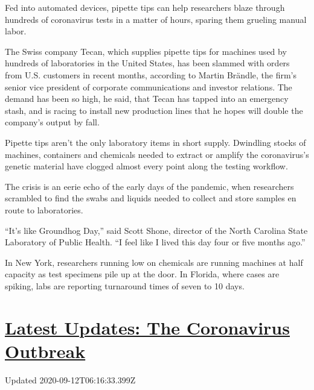 Fed into automated devices, pipette tips can help researchers blaze
through hundreds of coronavirus tests in a matter of hours, sparing them
grueling manual labor.

The Swiss company Tecan, which supplies pipette tips for machines used
by hundreds of laboratories in the United States, has been slammed with
orders from U.S. customers in recent months, according to Martin
Brändle, the firm's senior vice president of corporate communications
and investor relations. The demand has been so high, he said, that Tecan
has tapped into an emergency stash, and is racing to install new
production lines that he hopes will double the company's output by fall.

Pipette tips aren't the only laboratory items in short supply. Dwindling
stocks of machines, containers and chemicals needed to extract or
amplify the coronavirus's genetic material have clogged almost every
point along the testing workflow.

The crisis is an eerie echo of the early days of the pandemic, when
researchers scrambled to find the swabs and liquids needed to collect
and store samples en route to laboratories.

``It's like Groundhog Day,'' said Scott Shone, director of the North
Carolina State Laboratory of Public Health. ``I feel like I lived this
day four or five months ago.''

In New York, researchers running low on chemicals are running machines
at half capacity as test specimens pile up at the door. In Florida,
where cases are spiking, labs are reporting turnaround times of seven to
10 days.

\hypertarget{latest-updates-the-coronavirus-outbreak}{%
\section{\texorpdfstring{\href{https://www.nytimes3xbfgragh.onion/2020/09/11/world/covid-19-coronavirus.html?action=click\&pgtype=Article\&state=default\&region=MAIN_CONTENT_1\&context=storylines_live_updates}{Latest
Updates: The Coronavirus
Outbreak}}{Latest Updates: The Coronavirus Outbreak}}\label{latest-updates-the-coronavirus-outbreak}}

Updated 2020-09-12T06:16:33.399Z

